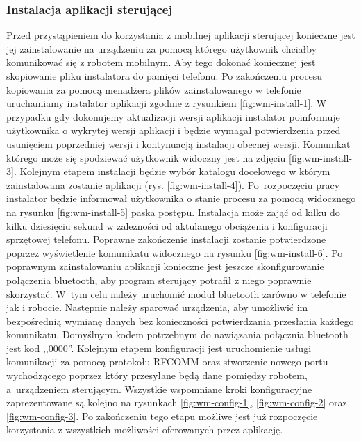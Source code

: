 \subsubsection{Instalacja aplikacji sterującej}
Przed przystąpieniem do korzystania z mobilnej aplikacji sterującej konieczne
jest jej zainstalowanie na urządzeniu za pomocą którego użytkownik chciałby
komunikować się z robotem mobilnym. Aby tego dokonać koniecznej jest skopiowanie
pliku instalatora do pamięci telefonu. Po zakończeniu procesu kopiowania za
pomocą menadżera plików zainstalowanego w telefonie uruchamiamy instalator
aplikacji zgodnie z rysunkiem \ref{fig:wm-install-1}. W przypadku gdy dokonujemy aktualizacji wersji
aplikacji instalator poinformuje użytkownika o wykrytej wersji aplikacji i będzie
wymagał potwierdzenia przed usunięciem poprzedniej wersji i kontynuacją
instalacji obecnej wersji. Komunikat którego może się spodziewać użytkownik
widoczny jest na zdjęciu \ref{fig:wm-install-3}. Kolejnym etapem instalacji
będzie wybór katalogu docelowego w którym zainstalowana zostanie aplikacji
(rys. \ref{fig:wm-install-4}). Po~rozpoczęciu pracy instalator będzie informował
użytkownika o stanie procesu za pomocą widocznego na rysunku
\ref{fig:wm-install-5} paska postępu. Instalacja może zająć od kilku do kilku
dziesięciu sekund w zależności od aktulanego obciążenia i konfiguracji
sprzętowej telefonu. Poprawne zakończenie instalacji zostanie potwierdzone poprzez wyświetlenie
komunikatu widocznego na rysunku \ref{fig:wm-install-6}. Po poprawnym
zainstalowaniu aplikacji konieczne jest jeszcze skonfigurowanie połączenia
bluetooth, aby program sterujący potrafił z niego poprawnie skorzystać. 
W~tym celu należy uruchomić moduł bluetooth zarówno w telefonie jak i robocie.
Następnie należy sparować urządzenia, aby umożliwić im bezpośrednią wymianę
danych bez konieczności potwierdzania przesłania każdego komunikatu. Domyślnym
kodem potrzebnym do nawiązania połącznia bluetooth jest kod ,,0000''. Kolejnym
etapem konfiguracji jest uruchomienie usługi komunikacji za pomocą
protokołu RFCOMM oraz stworzenie nowego portu wychodzącego poprzez który
przesyłane będą dane pomiędzy robotem, a~urządzeniem sterującym. Wszystkie
wspomniane kroki konfiguracyjne zaprezentowane są kolejno na rysunkach
\ref{fig:wm-config-1}, \ref{fig:wm-config-2} oraz \ref{fig:wm-config-3}. Po
zakończeniu tego etapu możliwe jest już rozpoczęcie korzystania z wszystkich
możliwości oferowanych przez aplikację.

